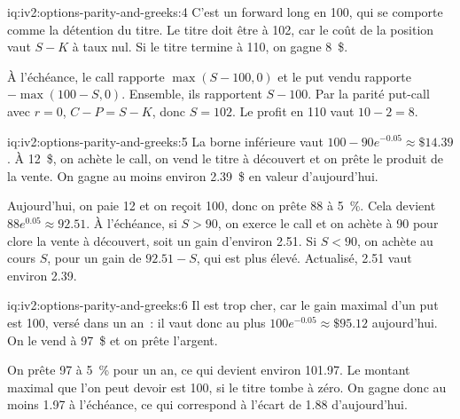 \begin{solution}{iq:iv2:options-parity-and-greeks:4}
C'est un forward long en 100, qui se comporte comme la détention du titre. Le titre doit être à 102, car le coût de la position vaut $S - K$ à taux nul. Si le titre termine à 110, on gagne 8~\$.

À l'échéance, le call rapporte $\max(S - 100, 0)$ et le put vendu rapporte $-\max(100 - S, 0)$. Ensemble, ils rapportent $S - 100$. Par la parité put-call avec $r = 0$, $C - P = S - K$, donc $S = 102$. Le profit en 110 vaut $10 - 2 = 8$.

\end{solution}

\begin{solution}{iq:iv2:options-parity-and-greeks:5}
La borne inférieure vaut $100 - 90e^{-0.05} \approx \$14.39$. À 12~\$, on achète le call, on vend le titre à découvert et on prête le produit de la vente. On gagne au moins environ 2.39~\$ en valeur d'aujourd'hui.

Aujourd'hui, on paie 12 et on reçoit 100, donc on prête 88 à 5~\%. Cela devient $88e^{0.05} \approx 92.51$. À l'échéance, si $S > 90$, on exerce le call et on achète à 90 pour clore la vente à découvert, soit un gain d'environ 2.51. Si $S < 90$, on achète au cours $S$, pour un gain de $92.51 - S$, qui est plus élevé. Actualisé, 2.51 vaut environ 2.39.

\end{solution}

\begin{solution}{iq:iv2:options-parity-and-greeks:6}
Il est trop cher, car le gain maximal d'un put est 100, versé dans un an~: il vaut donc au plus $100e^{-0.05} \approx \$95.12$ aujourd'hui. On le vend à 97~\$ et on prête l'argent.

On prête 97 à 5~\% pour un an, ce qui devient environ 101.97. Le montant maximal que l'on peut devoir est 100, si le titre tombe à zéro. On gagne donc au moins 1.97 à l'échéance, ce qui correspond à l'écart de 1.88 d'aujourd'hui.

\end{solution}

